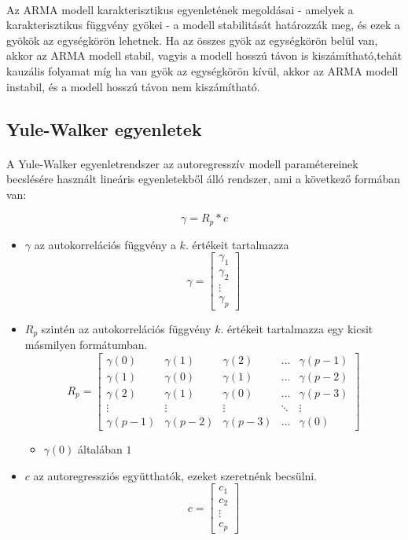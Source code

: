 \documentclass[11pt,a4paper]{article}
\begin{document}
					\paragraph{}
						Az ARMA modell karakterisztikus egyenletének megoldásai - amelyek a karakterisztikus függvény gyökei - a modell stabilitását határozzák meg, és ezek a gyökök az egységkörön lehetnek. Ha az összes gyök az egységkörön belül van, akkor az ARMA modell stabil, vagyis a modell hosszú távon is kiszámítható,tehát kauzális folyamat míg ha van gyök az egységkörön kívül, akkor az ARMA modell instabil, és a modell hosszú távon nem kiszámítható.
				\subsection{Yule-Walker egyenletek}
					\paragraph{}
						A Yule-Walker egyenletrendszer az autoregresszív modell paramétereinek becslésére használt lineáris egyenletekből álló rendszer, ami a következő formában van:
						
						$$\gamma = R_p * c$$
						
						\begin{itemize}
						\item $\gamma$ az autokorrelációs függvény a $k.$ értékeit tartalmazza
							$$\gamma = \left[ \begin{array}{c}
							\gamma_1 \\ \gamma_2 \\ \vdots \\ \gamma_p
							\end{array}\right]$$
						\item $R_p$ szintén az autokorrelációs függvény $k.$ értékeit tartalmazza egy kicsit másmilyen formátumban.
							$$R_p = \left[\begin{array}{cccccc}
							\gamma(0) & \gamma(1) & \gamma(2) & \dots & \gamma(p-1) \\
							\gamma(1) & \gamma(0) & \gamma(1) & \dots & \gamma(p-2) \\
							\gamma(2) & \gamma(1) & \gamma(0) & \dots & \gamma(p-3) \\
							\vdots & \vdots & \vdots & \ddots & \vdots \\
							\gamma(p-1) & \gamma(p-2) & \gamma(p-3) & \dots & \gamma(0)
							\end{array}\right]$$
						\begin{itemize}
							\item $\gamma(0)$ általában $1$
						\end{itemize}
						\item $c$ az autoregressziós együtthatók, ezeket szeretnénk becsülni.
							$$c = \left[\begin{array}{c}
							c_1 \\ c_2 \\ \vdots \\ c_p
							\end{array}\right]$$
						\end{itemize}
\end{document}
